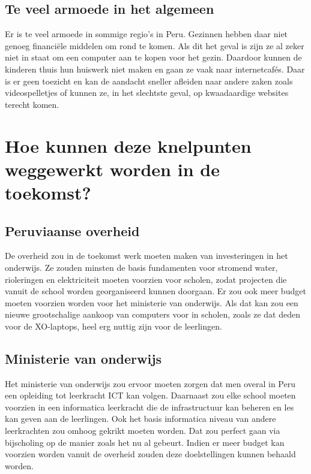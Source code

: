 \subsection{Te veel armoede in het algemeen}
Er is te veel armoede in sommige regio's in Peru. Gezinnen hebben daar niet genoeg financiële middelen om rond te komen. Als dit het geval is zijn ze al zeker niet in staat om een computer aan te kopen voor het gezin. Daardoor kunnen de kinderen thuis hun huiswerk niet maken en gaan ze vaak naar internetcafés. Daar is er geen toezicht en kan de aandacht sneller afleiden naar andere zaken zoals videospelletjes of kunnen ze, in het slechtste geval, op kwaadaardige websites terecht komen.

\section{Hoe kunnen deze knelpunten weggewerkt worden in de toekomst?}

\subsection{Peruviaanse overheid}
De overheid zou in de toekomst werk moeten maken van investeringen in het onderwijs. Ze zouden minsten de basis fundamenten voor stromend water, rioleringen en elektriciteit moeten voorzien voor scholen, zodat projecten die vanuit de school worden georganiseerd kunnen doorgaan. Er zou ook meer budget moeten voorzien worden voor het ministerie van onderwijs. Als dat kan zou een nieuwe grootschalige aankoop van computers voor in scholen, zoals ze dat deden voor de XO-laptops, heel erg nuttig zijn voor de leerlingen. 

\subsection{Ministerie van onderwijs}
Het ministerie van onderwijs zou ervoor moeten zorgen dat men overal in Peru een opleiding tot leerkracht ICT kan volgen. Daarnaast zou elke school moeten voorzien in een informatica leerkracht die de infrastructuur kan beheren en les kan geven aan de leerlingen. Ook het basis informatica niveau van andere leerkrachten zou omhoog gekrikt moeten worden. Dat zou perfect gaan via bijscholing op de manier zoals het nu al gebeurt. Indien er meer budget kan voorzien worden vanuit de overheid zouden deze doelstellingen kunnen behaald worden.

